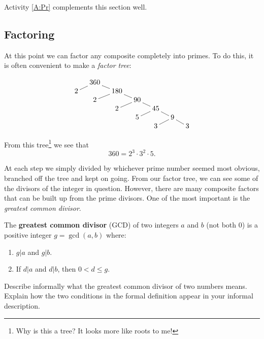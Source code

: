 \begin{activitynote}
Activity \ref{A:Pr} complements this section well.  %
\end{activitynote}


\subsection{Factoring}

At this point we can factor any composite completely into primes. To
do this, it is often convenient to make a \textit{factor
  tree}:

\[
\xymatrix@R=0pt@C=10pt{
  & 360 \ar@{-}[dl] \ar@{-}[dr] & & & & &\\
2 &     & 180 \ar@{-}[dl] \ar@{-}[dr] & & & & \\ 
  &  2   &     & 90 \ar@{-}[dl] \ar@{-}[dr] & & & \\
  &      &  2  &    & 45  \ar@{-}[dl] \ar@{-}[dr] & & \\ 
  &      &     & 5  &    & 9 \ar@{-}[dl] \ar@{-}[dr] &\\ 
  &      &     &    &  3  &  & 3
}
\]

From this tree\footnote{Why is this a tree? It looks more like roots to me!} we see that
\[
360 = 2^3 \cdot 3^2 \cdot 5.
\]

At each step we simply divided by whichever prime number seemed most
obvious, branched off the tree and kept on going. From our factor
tree, we can see some of the divisors of the integer in
question. However, there are many composite factors that can be built
up from the prime divisors. One of the most important is the
\textit{greatest common divisor}.

\begin{definition} 
The \textbf{greatest common divisor} (GCD) of two integers $a$ and $b$ (not both 0)
is a positive integer $g = \gcd(a,b)$ where:
\begin{enumerate}
\item $g|a$ and $g|b$.
\item If $d|a$ and $d|b$, then $0 < d \le g$.
\end{enumerate}
\end{definition}

\begin{question}
Describe informally what the greatest common divisor of two numbers means.  
Explain how the two conditions in the formal definition appear in your informal description. 
\end{question}
\QM

